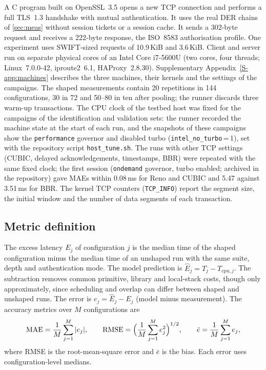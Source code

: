 \documentclass[preprint,12pt]{elsarticle}
\newcommand{\ms}{\,ms\xspace}
\newcommand{\cpu}{\mathrm{cpu}}
\begin{document}
A C program built on OpenSSL~3.5 opens a new TCP connection and performs a full TLS~1.3 handshake with mutual authentication. It uses the real DER chains of \cref{sec:meas} without session tickets or a session cache. It sends a 302-byte request and receives a 222-byte response, the ISO~8583 authorisation profile. One experiment uses SWIFT-sized requests of 10.9\,KiB and 3.6\,KiB. Client and server run on separate physical cores of an Intel Core i7-5600U (two cores, four threads; Linux~7.0.0-42, iproute2~6.1, HAProxy~2.8.30). Supplementary Appendix~\ref{S-app:machines} describes the three machines, their kernels and the settings of the campaigns. The shaped measurements contain 20 repetitions in 144 configurations, 30 in 72 and 50--80 in ten after pooling; the runner discards three warm-up transactions. The CPU clock of the testbed host was fixed for the campaigns of the identification and validation sets: the runner recorded the machine state at the start of each run, and the snapshots of these campaigns show the \texttt{performance} governor and disabled turbo (\texttt{intel\_no\_turbo}\,=\,1), set with the repository script \texttt{host\_tune.sh}. The runs with other TCP settings (CUBIC, delayed acknowledgements, timestamps, BBR) were repeated with the same fixed clock; the first session (\texttt{ondemand} governor, turbo enabled; archived in the repository) gave MAEs within 0.08\ms for Reno and CUBIC and 5.47 against 3.51\ms for BBR. The kernel TCP counters (\texttt{TCP\_INFO}) report the segment size, the initial window and the number of data segments of each transaction.

\subsection{Metric definition}
The excess latency $E_j$ of configuration $j$ is the median time of the shaped configuration minus the median time of an unshaped run with the same suite, depth and authentication mode. The model prediction is $\hat{E}_j=T_j-T_{\cpu,j}$. The subtraction removes common primitive, library and local-stack costs, though only approximately, since scheduling and overlap can differ between shaped and unshaped runs. The error is $e_j=\hat{E}_j-E_j$ (model minus measurement). The accuracy metrics over $M$ configurations are
\begin{equation}
\mathrm{MAE}=\frac{1}{M}\sum_{j=1}^{M}|e_j|,\qquad
\mathrm{RMSE}=\Bigl(\frac{1}{M}\sum_{j=1}^{M}e_j^2\Bigr)^{1/2},\qquad
\bar{e}=\frac{1}{M}\sum_{j=1}^{M}e_j,
\label{eq:metrics}
\end{equation}
where RMSE is the root-mean-square error and $\bar{e}$ is the bias. Each error uses configuration-level medians.
\end{document}

